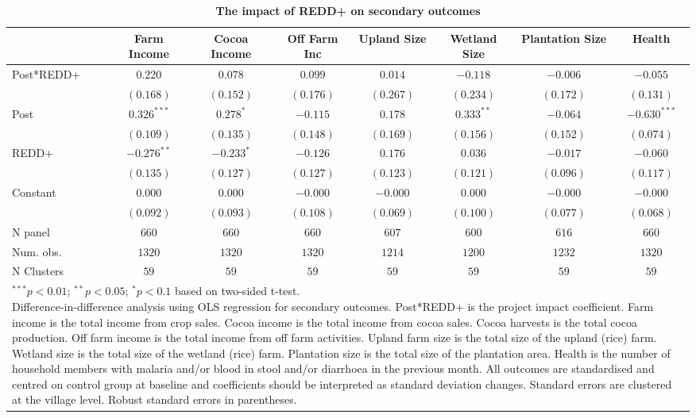 \documentclass[
]{article}
\begin{document}
\begin{landscape}

\begin{table}[h]
\caption{\textbf{The impact of REDD+ on secondary outcomes}}
\begin{center}
\begin{tabular}{l c c c c c c c}
\hline
 & Farm Income & Cocoa Income & Off Farm Inc & Upland Size & Wetland Size & Plantation Size & Health \\
\hline
Post*REDD+ & $0.220$       & $0.078$      & $0.099$   & $0.014$   & $-0.118$     & $-0.006$  & $-0.055$       \\
           & $(0.168)$     & $(0.152)$    & $(0.176)$ & $(0.267)$ & $(0.234)$    & $(0.172)$ & $(0.131)$      \\
Post       & $0.326^{***}$ & $0.278^{*}$  & $-0.115$  & $0.178$   & $0.333^{**}$ & $-0.064$  & $-0.630^{***}$ \\
           & $(0.109)$     & $(0.135)$    & $(0.148)$ & $(0.169)$ & $(0.156)$    & $(0.152)$ & $(0.074)$      \\
REDD+      & $-0.276^{**}$ & $-0.233^{*}$ & $-0.126$  & $0.176$   & $0.036$      & $-0.017$  & $-0.060$       \\
           & $(0.135)$     & $(0.127)$    & $(0.127)$ & $(0.123)$ & $(0.121)$    & $(0.096)$ & $(0.117)$      \\
Constant   & $0.000$       & $0.000$      & $-0.000$  & $-0.000$  & $0.000$      & $-0.000$  & $-0.000$       \\
           & $(0.092)$     & $(0.093)$    & $(0.108)$ & $(0.069)$ & $(0.100)$    & $(0.077)$ & $(0.068)$      \\
\hline
N panel    & $660$         & $660$        & $660$     & $607$     & $600$        & $616$     & $660$          \\
Num. obs.  & $1320$        & $1320$       & $1320$    & $1214$    & $1200$       & $1232$    & $1320$         \\
N Clusters & $59$          & $59$         & $59$      & $59$      & $59$         & $59$      & $59$           \\
\hline
\multicolumn{8}{l}{\scriptsize{\parbox{.84\linewidth}{\vspace{2pt}$^{***}p<0.01$; $^{**}p<0.05$; $^{*}p<0.1$ based on two-sided t-test.\\
       Difference-in-difference analysis using OLS regression for secondary outcomes. Post*REDD+ is the project impact coefficient. Farm income is the total income from crop sales. Cocoa income is the total income from cocoa sales. Cocoa harvests is the total cocoa production. Off farm income is the total income from off farm activities. Upland farm size is the total size of the upland (rice) farm. Wetland size is the total size of the wetland (rice) farm. Plantation size is the total size of the plantation area. Health is the number of household members with malaria and/or blood in stool and/or diarrhoea in the previous month. All outcomes are standardised and centred on control group at baseline and coefficients should be interpreted as standard deviation changes. Standard errors are clustered at the village level. Robust standard errors in parentheses.}}}

\end{tabular}
\end{center}
\end{table}
\end{landscape}
\end{document}
